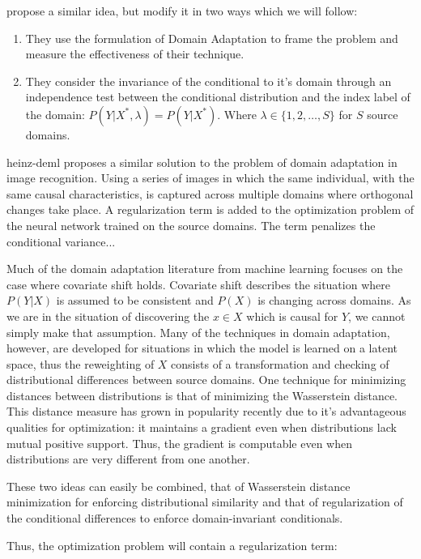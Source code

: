 \documentclass[a4paper,12pt]{article}
\begin{document}
\cite{Rojas-carulla2018} propose a similar idea, but modify it in two ways which we will follow: 

\begin{enumerate}
\item They use the formulation of Domain Adaptation to frame the problem and measure the effectiveness of their technique. 
\item They consider the invariance of the conditional to it's domain through an independence test between the conditional distribution and the index label of the domain: $P(Y | X^*, \lambda) = P(Y | X^*)$. Where $\lambda \in \{1,2,\ldots,S \}$ for $S$ source domains. 
\end{enumerate}

heinz-deml proposes a similar solution to the problem of domain adaptation in image recognition. Using a series of images in which the same individual, with the same causal characteristics, is captured across multiple domains where orthogonal changes take place. A regularization term is added to the optimization problem of the neural network trained on the source domains. The term penalizes the conditional variance... 

Much of the domain adaptation literature from machine learning focuses on the case where covariate shift holds. Covariate shift describes the situation where $P(Y|X)$ is assumed to be consistent and $P(X)$ is changing across domains. As we are in the situation of discovering the $x \in X$ which is causal for $Y$, we cannot simply make that assumption. Many of the techniques in domain adaptation, however, are developed for situations in which the model is learned on a latent space, thus the reweighting of $X$ consists of a transformation and checking of distributional differences between source domains. One technique for minimizing distances between distributions is that of minimizing the Wasserstein distance. This distance measure has grown in popularity recently due to it's advantageous qualities for optimization: it maintains a gradient even when distributions lack mutual positive support. Thus, the gradient is computable even when distributions are very different from one another. 

These two ideas can easily be combined, that of Wasserstein distance minimization for enforcing distributional similarity and that of regularization of the conditional differences to enforce domain-invariant conditionals. 

Thus, the optimization problem will contain a regularization term: 
\end{document}
